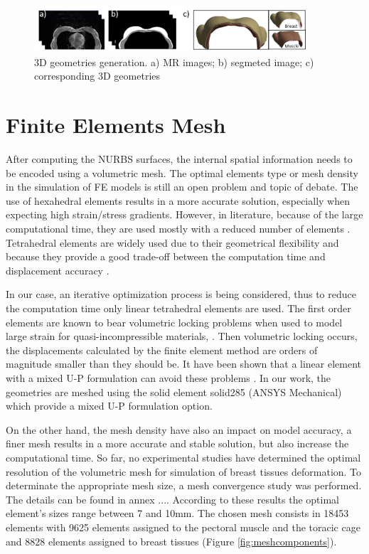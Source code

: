 \begin{figure}[!h]
\centering
\includegraphics[width=0.9\textwidth,keepaspectratio]{figures/3dgeometries.png} 
\caption{3D geometries generation. a) MR images; b) segmeted image; c) corresponding 3D geometries}\label{fig:3dgeometries}
\end{figure}

\section{ Finite Elements Mesh}\label{section:myFEM}

After computing the NURBS surfaces, the internal spatial information needs to be encoded using a volumetric mesh. The optimal elements type or mesh density in the simulation of FE models is still an open problem and topic of debate. The use of hexahedral elements results in a more accurate solution, especially when expecting high strain/stress gradients. However, in literature, because of the large computational time, they are used mostly with a reduced number of elements \citep{ruiter_model_based_2006,gamage_modelling_2012}. Tetrahedral elements are widely used due to their geometrical flexibility and because they provide a good trade-off between the computation time and displacement accuracy \citep{han_nonlinear_2014,palomar_finite_2008,griesenauer_breast_2017}.   

In our case, an iterative optimization process is being considered, thus to reduce the computation time  only linear tetrahedral elements are used. The first order elements are known to bear volumetric locking problems when used to model large strain for quasi-incompressible materials, \citep{fung_classical_2017}. Then volumetric locking occurs, the displacements calculated by the finite element method are orders of magnitude smaller than they should be. It have been shown that a linear element with a mixed U-P formulation can avoid these problems \citep{rohan_finite_2014}. In our work, the geometries are meshed using the solid element solid285 (ANSYS Mechanical) which provide a mixed U-P formulation option. 

 On the other hand, the mesh density have also an impact on model accuracy, a finer mesh results in a more accurate and stable solution, but also increase the computational time. So far, no experimental studies have determined the optimal resolution of the volumetric mesh for simulation of breast tissues deformation. To determinate the appropriate mesh size, a mesh convergence study was performed. The details can be found in annex ....  According to these results the optimal element’s sizes range between 7 and 10mm. The chosen mesh consists in 18453 elements with 9625 elements assigned to the pectoral muscle and the toracic cage and 8828 elements assigned to breast tissues (Figure \ref{fig:meshcomponents}).
 
